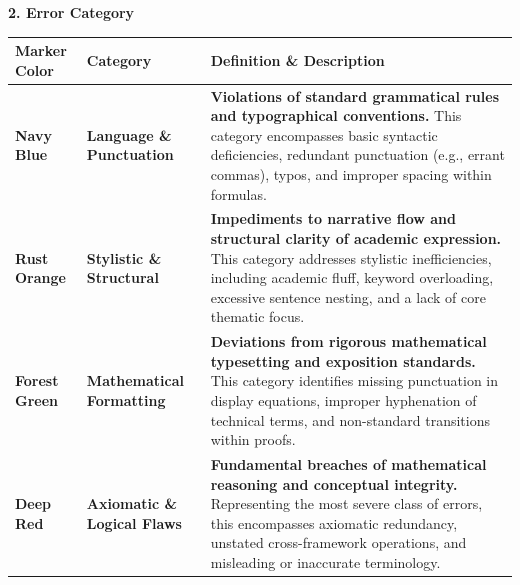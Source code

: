 \documentclass[11pt]{article}
\numberwithin{equation}{section}
\theoremstyle{definition}
\begin{document}
\begin{titlepage}
    
    \begin{flushleft}
        \large \textbf{2. Error Category} \\[0.5cm]
        \renewcommand{\arraystretch}{1.5}
        \begin{tabular}{|l|l|p{8.5cm}|}
            \hline
            \rowcolor{gray!10} \textbf{Marker Color} & \textbf{Category} & \textbf{Definition \& Description} \\ \hline
            {\color{colorLang} \textbf{Navy Blue}} & \textbf{Language \& Punctuation} &  \textbf{Violations of standard grammatical rules and typographical conventions.} This category encompasses basic syntactic deficiencies, redundant punctuation (e.g., errant commas), typos, and improper spacing within formulas. \\ \hline
            {\color{colorStyle} \textbf{Rust Orange}} & \textbf{Stylistic \& Structural} & \textbf{Impediments to narrative flow and structural clarity of academic expression.} This category addresses stylistic inefficiencies, including academic fluff, keyword overloading, excessive sentence nesting, and a lack of core thematic focus. \\ \hline
            {\color{colorMath} \textbf{Forest Green}} & \textbf{Mathematical Formatting} &  \textbf{Deviations from rigorous mathematical typesetting and exposition standards.} This category identifies missing punctuation in display equations, improper hyphenation of technical terms, and non-standard transitions within proofs.\\ \hline
            {\color{colorLogic} \textbf{Deep Red}} & \textbf{Axiomatic \& Logical Flaws} & \textbf{Fundamental breaches of mathematical reasoning and conceptual integrity.} Representing the most severe class of errors, this encompasses axiomatic redundancy, unstated cross-framework operations, and misleading or inaccurate terminology.\\ \hline
        \end{tabular}
    \end{flushleft}
\end{titlepage}
\newpage



\maketitle
\end{document}
